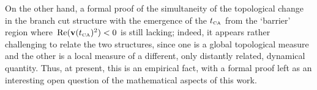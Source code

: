 On the other hand, a formal proof of the simultaneity of the topological change in the branch cut structure with the emergence of the ${t_{\scriptscriptstyle\mathrm{CA}}}$ from the `barrier' region where~$\Re(\vb{v}({t_{\scriptscriptstyle\mathrm{CA}}})^2)<0$ is still lacking; indeed, it appears rather challenging to relate the two structures, since one is a global topological measure and the other is a local measure of a different, only distantly related, dynamical quantity. Thus, at present, this is an empirical fact, with a formal proof left as an interesting open question of the mathematical aspects of this work.




\pagebreak

\pagestyle{figure5Kstyle}





